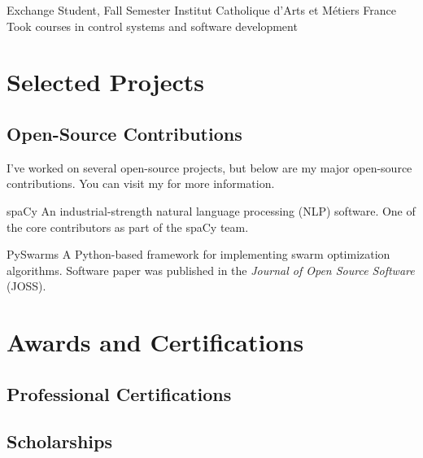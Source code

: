\documentclass[12pt,a4paper]{moderncv}
\begin{document}
{Exchange Student, Fall Semester}
{Institut Catholique d'Arts et M\'etiers}
{France}{}
{Took courses in control systems and software development}

\section{Selected Projects}

\subsection{Open-Source Contributions}

I've worked on several open-source projects, but below are my major open-source
contributions. You can visit my {\color{blue}} for more information.


{\color{blue}
    }
{spaCy}{}{}
{
    An industrial-strength natural language processing (NLP) software. One of 
    the core contributors as part of the spaCy team.
}

{\color{blue} }
{PySwarms}{}{}
{
    A Python-based framework for implementing swarm optimization
    algorithms. Software paper was published in the \textit{Journal of Open
        Source Software} (JOSS).
}


\section{Awards and Certifications}

\subsection{Professional Certifications}

\subsection{Scholarships}


\nocite{*}


\end{document}
